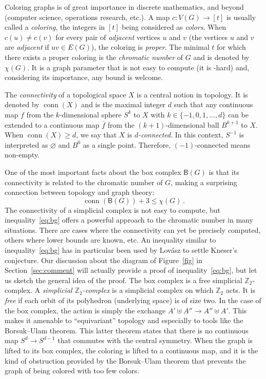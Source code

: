 \documentclass[12pt]{amsart}
\theoremstyle{definition}
\def\Z{\mathbb{Z}}
\def\B{\mathsf{B}}
\renewcommand{\geq}{\geqslant}
\renewcommand{\leq}{\leqslant}
\def\conn{\operatorname{conn}}
\begin{document}
Coloring graphs is of great importance in discrete mathematics, and beyond (computer science, operations research, etc.). A map $c\colon V(G)\rightarrow [t]$ is usually called a {\em coloring}, the integers in $[t]$ being considered as {\em colors}. When $c(u)\neq c(v)$ for every pair of \emph{adjacent} vertices $u$ and $v$ (the vertices $u$ and $v$ are \emph{adjacent} if $uv\in E(G)$), the coloring is {\em proper}. The minimal $t$ for which there exists a proper coloring is the {\em chromatic number} of $G$ and is denoted by $\chi(G)$. It is a graph parameter that is not easy to compute (it is \NP-hard) and, considering its importance, any bound is welcome.

The {\em connectivity} of a topological space $X$ is a central notion in topology. It is denoted by $\conn(X)$ and is the maximal integer $d$ such that any continuous map $f$ from the $k$-dimensional sphere $S^k$ to $X$ with $k\in\{-1,0,1,\ldots,d\}$ can be extended to a continuous map $\bar f$ from the $(k+1)$-dimensional ball $B^{k+1}$ to $X$. When $\conn(X) \geq d$, we say that $X$ is {\em $d$-connected}. In this context, $S^{-1}$ is interpreted as $\varnothing$ and $B^0$ as a single point. Therefore, $(-1)$-connected means non-empty.

One of the most important facts about the box complex $\B(G)$ is that its connectivity is related to the chromatic number of $G$, making a surprising connection between topology and graph theory:
\begin{equation}\label{eq:bg}
\conn(\B(G))+3 \leq \chi(G)\,.
\end{equation}
The connectivity of a simplicial complex is not easy to compute, but inequality~\eqref{eq:bg} offers a powerful approach to the chromatic number in many situations. There are cases where the connectivity can yet be precisely computed, others where lower bounds are known, etc. An inequality similar to inequality~\eqref{eq:bg} has in particular been used by Lov\'asz to settle Kneser's conjecture. %
Our discussion about the diagram of Figure~\ref{fig} in Section~\ref{sec:comment} will actually provide a proof of inequality~\eqref{eq:bg}, but let us sketch the general idea of the proof. The box complex is a free simplicial $\Z_2$-complex. A \emph{simplicial $\Z_2$-complex} is a simplicial complex on which $\Z_2$ acts. It is \emph{free} if each orbit of its polyhedron (underlying space) is of size two. In the case of the box complex, the action is simply the exchange $A' \uplus A'' \rightarrow A'' \uplus A'$. This makes it amenable to ``equivariant'' topology and especially to tools like the Borsuk--Ulam theorem. This latter theorem states that there is no continuous map $S^d \rightarrow S^{d-1}$ that commutes with the central symmetry. %
When the graph is lifted to its box complex, the coloring is lifted to a continuous map, and it is the kind of obstruction provided by the Borsuk--Ulam theorem that prevents the graph of being colored with too few colors.
\end{document}
